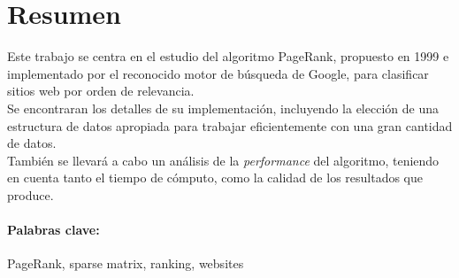 \documentclass[10pt,a4paper,spanish]{article}
\begin{document}



\maketitle

\section{Resumen} %

Este trabajo se centra en el estudio del algoritmo PageRank, propuesto en 1999 e implementado por el reconocido motor de búsqueda de Google, para clasificar sitios web por orden de relevancia. \\

Se encontraran los detalles de su implementación, incluyendo la elección de una estructura de datos apropiada para trabajar eficientemente con una gran cantidad de datos. \\

También se llevará a cabo un análisis de la \textit{performance} del algoritmo, teniendo en cuenta tanto el tiempo de cómputo, como la calidad de los resultados que produce.

\paragraph{Palabras clave:} %
PageRank, sparse matrix, ranking, websites
\newpage

\tableofcontents

\clearpage


\clearpage


\clearpage


\clearpage


\clearpage


\end{document}
